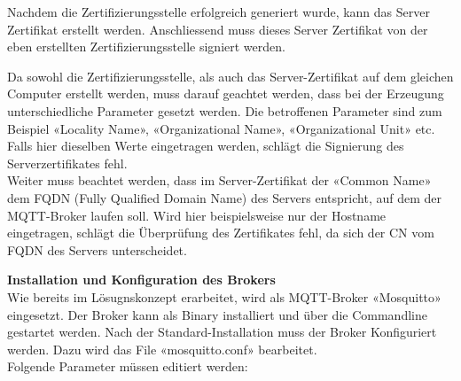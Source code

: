 Nachdem die Zertifizierungsstelle erfolgreich generiert wurde, kann das Server Zertifikat erstellt werden. Anschliessend muss dieses Server Zertifikat von der eben erstellten Zertifizierungsstelle signiert werden.

Da sowohl die Zertifizierungsstelle, als auch das Server-Zertifikat auf dem gleichen Computer erstellt werden, muss darauf geachtet werden, dass bei der Erzeugung unterschiedliche Parameter gesetzt werden. Die betroffenen Parameter sind zum Beispiel «Locality Name», «Organizational Name», «Organizational Unit» etc. Falls hier dieselben Werte eingetragen werden, schlägt die Signierung des Serverzertifikates fehl. \\
Weiter muss beachtet werden, dass im Server-Zertifikat der «Common Name» dem FQDN (Fully Qualified Domain Name) des Servers entspricht, auf dem der MQTT-Broker laufen soll. Wird hier beispielsweise nur der Hostname eingetragen, schlägt die Überprüfung des Zertifikates fehl, da sich der CN vom FQDN des Servers unterscheidet.

\textbf{Installation und Konfiguration des Brokers} \\
Wie bereits im Lösugnskonzept erarbeitet, wird als MQTT-Broker «Mosquitto» eingesetzt. Der Broker kann als Binary installiert und über die Commandline gestartet werden.
Nach der Standard-Installation muss der Broker Konfiguriert werden. Dazu wird das File «mosquitto.conf» bearbeitet.
\\Folgende Parameter müssen editiert werden:

